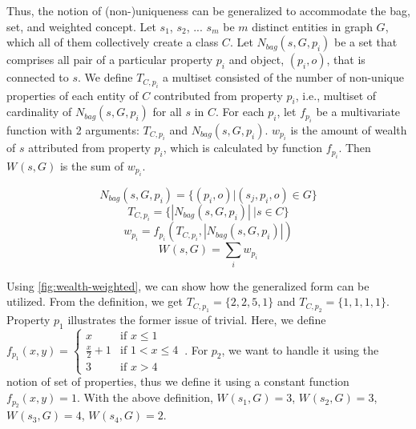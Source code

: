 

Thus, the notion of (non-)uniqueness can be generalized to accommodate the bag, set, and weighted concept. Let \(s_1\), \(s_2\), ... \(s_m\) be \(m\) distinct entities in graph \(G\), which all of them collectively create a class \(C\). Let \(N_{bag}(s,G,p_i)\) be a set that comprises all pair of a particular property \(p_i\) and object, \((p_i,o)\), that is connected to \(s\). We define \(T_{C,p_i}\) a multiset consisted of the number of non-unique properties of each entity of \(C\) contributed from property \(p_i\), i.e., multiset of cardinality of \(N_{bag}(s,G,p_i)\) for all \(s\) in \(C\). For each \(p_i\), let \(f_{p_i}\) be a multivariate function with 2 arguments: \(T_{C,p_i}\) and \(N_{bag}(s,G,p_i)\). \(w_{p_i}\) is the amount of wealth of \(s\) attributed from property \(p_i\), which is calculated by function \(f_{p_i}\). Then \(W_{}(s, G)\) is the sum of \(w_{p_i}\).


\[
    N_{bag}(s,G,p_i) = \{(p_i,o) | (s_j, p_i, o) \in G\}
\]
\[
    T_{C,p_i} = \{|N_{bag}(s,G,p_i)|\ | s \in C\}
\]
\[
    w_{p_i} = f_{p_i}(T_{C,p_i}, |N_{bag}(s,G,p_i)|)
\]
\[
    W_{}(s, G) = \sum_i w_{p_i}
\]

Using \autoref{fig:wealth-weighted}, we can show how the generalized form can be utilized. From the definition, we get \(T_{C,p_1} = \{2, 2, 5, 1\}\) and \(T_{C,p_2} = \{1, 1, 1, 1\}\). Property \(p_1\) illustrates the former issue of trivial. Here, we define $f_{p_1}(x,y) = \begin{cases}
      x & \text{if }x \leq 1 \\
      \frac{x}{2} + 1 & \text{if }1 < x \leq 4 \\
      3 & \text{if }x > 4
    \end{cases}\, $.
For \(p_2\), we want to handle it using the notion of set of properties, thus we define it using a constant function \(f_{p_2}(x,y) = 1\).
With the above definition, \(W_{}(s_1, G) = 3\), \(W_{}(s_2, G) = 3\), \(W_{}(s_3, G) = 4\), \(W_{}(s_4, G) = 2\).